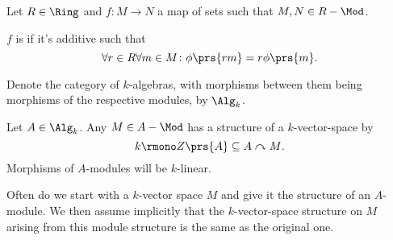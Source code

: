 \documentclass[10pt,a4paper,twoside,openany,hidelinks]{book}
\begin{document}
\begin{definition}
Let $R \in \Ring$ and $f \colon M \to N$ a map of sets such that $M,N \in R-\Mod$.

$f$ is  if it's additive such that
\[\forall r \in R \forall m \in M \colon \phi\prs{rm} = r \phi\prs{m} \text{.}\]
\end{definition}

\begin{notation}
Denote the category of $k$-algebras, with morphisms between them being morphisms of the respective modules, by $\Alg_k$.
\end{notation}

\begin{remark}
Let $A \in \Alg_k$.
Any $M \in A-\Mod$ has a structure of a $k$-vector-space by
\[k \rmono Z\prs{A} \subseteq A \acts M \text{.}\]
Morphisms of $A$-modules will be $k$-linear. 

Often do we start with a $k$-vector space $M$ and give it the structure of an $A$-module.
We then assume implicitly that the $k$-vector-space structure on $M$ arising from this module structure is the same as the original one.
\end{remark}



\begin{comment}
\begin{thebibliography}{2}
\bibitem{context} 
Emily Riehl. 
\textit{Category Theory in Context}. 

\bibitem{nlab}
\textit{nLab - Online Wiki with Focus on Category Theory and Homotopy Theory}.\\
\href{https://ncatlab.org/nlab/show/HomePage}{https://ncatlab.org/nlab/show/HomePage}
\end{thebibliography}
\end{comment}

\backmatter
\end{document}
